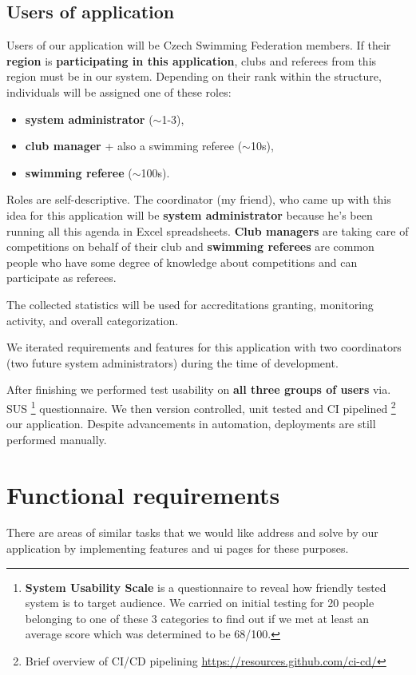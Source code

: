 \subsection*{Users of application}
Users of our application will be Czech Swimming Federation members. If their \textbf{region} is \textbf{participating in this application}, clubs and referees from this region must be in our system. Depending on their rank within the structure, individuals will be assigned one of these roles: 
\begin{itemize}
  \item \textbf{system administrator} ($\sim$1-3),
  \item \textbf{club manager} + also a swimming referee ($\sim$10s),
  \item \textbf{swimming referee} ($\sim$100s).
\end{itemize} 
Roles are self-descriptive. The coordinator (my friend), who came up with this idea for this application will be \textbf{system administrator} because he's been running all this agenda in Excel spreadsheets. \textbf{Club managers} are taking care of competitions on behalf of their club and \textbf{swimming referees} are common people who have some degree of knowledge about competitions and can participate as referees. \par 
The collected statistics will be used for accreditations granting, monitoring activity, and overall categorization.
\par
We iterated requirements and features for this application with two coordinators (two future system administrators) during the time of development. \par
After finishing we performed test usability on \textbf{all three groups of users} via. SUS \footnote{\textbf{System Usability Scale} is a questionnaire to reveal how friendly tested system is to target audience. We carried on initial testing for 20 people belonging to one of these 3 categories to find out if we met at least an average score which was determined to be 68/100.} questionnaire. We then version controlled, unit tested and CI pipelined \footnote{Brief overview of CI/CD pipelining \url{https://resources.github.com/ci-cd/}} our application. Despite advancements in automation, deployments are still performed manually.
\section{Functional requirements}
There are areas of similar tasks that we would like address and solve by our application by implementing features and ui pages for these purposes.

